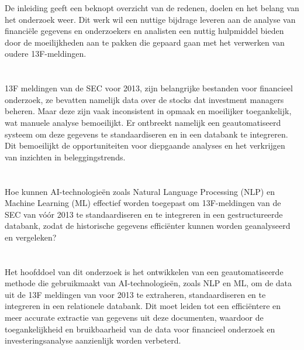 De inleiding geeft een beknopt overzicht van de redenen, doelen en het belang van het onderzoek weer. Dit werk wil een nuttige bijdrage leveren aan de analyse van financiële gegevens en onderzoekers en analisten een nuttig hulpmiddel bieden door de moeilijkheden aan te pakken die gepaard gaan met het verwerken van oudere 13F-meldingen.

\section{}%
\label{sec:probleemstelling}

13F meldingen van de SEC voor 2013, zijn belangrijke bestanden voor financieel onderzoek, ze bevatten namelijk data over de stocks dat investment managers beheren. Maar deze zijn vaak inconsistent in opmaak en moeilijker toegankelijk, wat manuele analyse bemoeilijkt. Er ontbreekt namelijk een geautomatiseerd systeem om deze gegevens te standaardiseren en in een databank te integreren. Dit bemoeilijkt de opportuniteiten voor diepgaande analyses en het verkrijgen van inzichten in beleggingstrends.

\section{}%
\label{sec:onderzoeksvraag}

Hoe kunnen AI-technologieën zoals Natural Language Processing (NLP) en Machine Learning (ML) effectief worden toegepast om 13F-meldingen van de SEC van vóór 2013 te standaardiseren en te integreren in een gestructureerde databank, zodat de historische gegevens efficiënter kunnen worden geanalyseerd en vergeleken?


\section{}%
\label{sec:onderzoeksdoelstelling}

Het hoofddoel van dit onderzoek is het ontwikkelen van een geautomatiseerde methode die gebruikmaakt van AI-technologieën, zoals NLP en ML, om de data uit de 13F meldingen van voor 2013 te extraheren, standaardiseren en te integreren in een relationele databank. Dit moet leiden tot een efficiëntere en meer accurate extractie van gegevens uit deze documenten, waardoor de toegankelijkheid en bruikbaarheid van de data voor financieel onderzoek en investeringsanalyse aanzienlijk worden verbeterd. 


